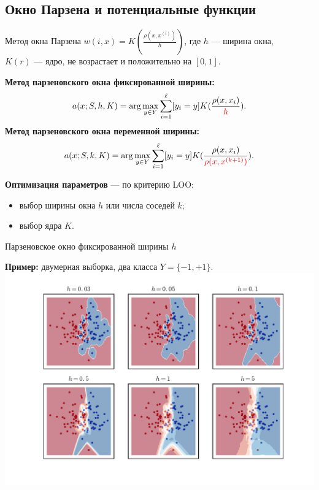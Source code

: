 \documentclass{beamer}
\begin{document}
\subsection{Окно Парзена и потенциальные функции}
\begin{frame}{Метод окна Парзена}
$w(i,x) = K(\frac{\rho(x, x^{(i)})}{h})$, где $h$ --- ширина окна, \\
$K(r)$ --- ядро, не возрастает и положительно на $[0,1]$.

{\bf Метод парзеновского окна фиксированной ширины:}
$$
a(x; S, h, K) = \arg\max_{y \in Y}\sum\limits_{i=1}^{\ell}[y_i = y]K(\frac{\rho(x, x_i)}{\color{red} h}).
$$
{\bf Метод парзеновского окна переменной ширины:}
$$
a(x; S, k, K) = \arg\max_{y \in Y}\sum\limits_{i=1}^{\ell}[y_i = y]K(\frac{\rho(x, x_i)}{\color{red}\rho(x, x^{(k+1)})}).
$$

{\bf Оптимизация параметров} --- по критерию LOO:
\begin{itemize}
    \item выбор ширины окна $h$ или числа соседей $k$;
    \item выбор ядра $K$.
\end{itemize}
\end{frame}

\begin{frame}{Парзеновское окно фиксированной ширины $h$}

{\bf Пример:} двумерная выборка, два класса $Y = \{-1, +1\}$.
\includegraphics[width=\linewidth]{../fig/knn.pdf}
\end{frame}
\end{document}
